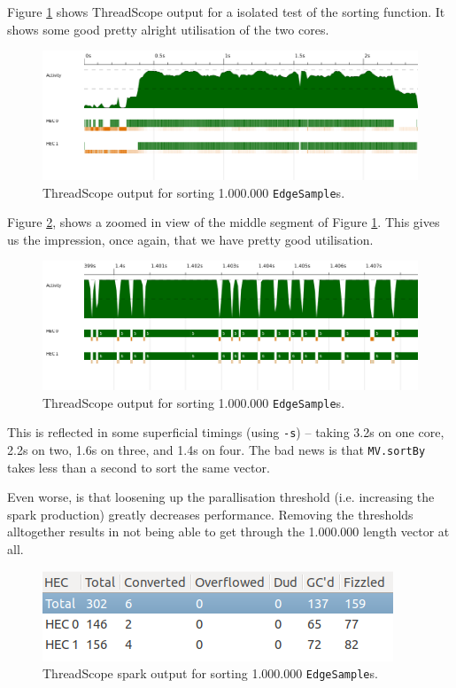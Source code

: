 \documentclass[12pt, a4paper]{article}
\begin{document}
 Figure \ref{fig:sorting-thread} shows ThreadScope output for a isolated test of the sorting function.
 It shows some good pretty alright utilisation of the two cores.

 \begin{figure}[h!]
  \centering
  \includegraphics[width=0.85\linewidth]{../threadscope/sorting/sorting-final}
  \caption{ThreadScope output for sorting 1.000.000 \texttt{EdgeSample}s.}
  \label{fig:sorting-thread}
\end{figure}

Figure \ref{fig:sorting-thread-zoomed}, shows a zoomed in view of the middle segment of Figure \ref{fig:sorting-thread}.
This gives us the impression, once again, that we have pretty good utilisation.

 \begin{figure}[h!]
  \centering
  \includegraphics[width=0.85\linewidth]{../threadscope/sorting/sorting-final-zoom}
  \caption{ThreadScope output for sorting 1.000.000 \texttt{EdgeSample}s.}
  \label{fig:sorting-thread-zoomed}
\end{figure}

This is reflected in some superficial timings (using \texttt{-s}) -- taking 3.2s on one core, 2.2s on two, 1.6s on three, and 1.4s on four. The bad news is that \texttt{MV.sortBy} takes less than a second to sort the same vector.

Even worse, is that loosening up the parallisation threshold (i.e. increasing the spark production)
greatly decreases performance. Removing the thresholds alltogether results in not being able to get
 through the 1.000.000 length vector at all.
 \begin{figure}[h!]
  \centering
  \includegraphics[width=0.6\linewidth]{../threadscope/sorting/sorting-final-sparks}
  \caption{ThreadScope spark output for sorting 1.000.000 \texttt{EdgeSample}s.}
  \label{fig:sorting-thread-sparks}
\end{figure}
\end{document}
